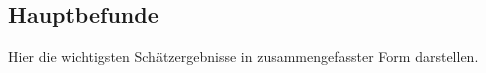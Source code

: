 
\subsection{Hauptbefunde}
Hier die wichtigsten Schätzergebnisse in zusammengefasster Form darstellen.




